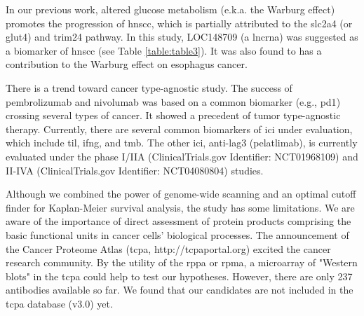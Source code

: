 \documentclass[jpm,article,submit,moreauthors,pdftex]{Definitions/mdpi}
\newenvironment{MyColorPar}[1]{%
    \leavevmode\color{#1}\ignorespaces%
}{%
}%
\begin{document}
\begin{paracol}{2}
In our previous work, altered glucose metabolism (e.k.a. the Warburg effect\cite{Warburg1956}) promotes the progression of \acrshort{hnscc}, which is partially attributed to the \acrfull{slc2a4} (or \acrfull{glut4}) and \acrfull{trim24} pathway\cite{Chang2017b}. In this study, LOC148709 (a \acrfull{lncrna}) was suggested as a biomarker of \acrshort{hnscc} (see Table \ref{table:table3}).
It was also found to has a contribution to the Warburg effect on esophagus cancer\cite{Liu2019}. 

There is a trend toward cancer type-agnostic study. The success of pembrolizumab and nivolumab was based on a common biomarker (e.g., \acrshort{pd1}) crossing several types of cancer.
It showed a precedent of tumor type-agnostic therapy\cite{Yan2018}.
Currently, there are several common biomarkers of \acrshort{ici} under evaluation, which include \acrfull{til}, \acrfull{ifng}, and \acrfull{tmb}\cite{Gavrielatou2020}.
The other  \acrshort{ici}, anti-\acrshort{lag3} (pelatlimab), is currently evaluated under the phase I/IIA\cite{Cristina2019}\linebreak
(ClinicalTrials.gov Identifier: NCT01968109) and II-IVA\cite{Neal2019} (ClinicalTrials.gov Identifier: NCT04080804) studies.

Although we combined the power of genome-wide scanning and an optimal cutoff finder for Kaplan-Meier survival analysis, the study has some limitations.
We are aware of the importance of direct assessment of protein products comprising the basic functional units in cancer cells' biological processes. The announcement of the Cancer Proteome Atlas (\acrshort{tcpa}, http://tcpaportal.org) excited the cancer research community\cite{Li2013c}\cite{Li2017b}. By the utility of the \acrfull{rppa} or \acrfull{rpma}, a microarray of "Western blots" in the \acrshort{tcpa} could help to test our hypotheses.
However, there are only 237 antibodies available so far. We found that our candidates are not included in the \acrshort{tcpa} database (v3.0\cite{Chen2019}) yet. %


\end{paracol}
\end{document}
